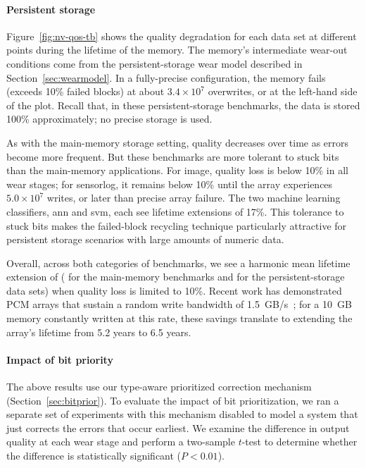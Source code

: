 \documentclass[prodmode,acmtocs]{acmsmall}
\begin{document}
\paragraph{Persistent storage}

Figure~\ref{fig:nv-qos-tb} shows the quality degradation for each data set at
different points during the lifetime of the memory.
The memory's intermediate
wear-out conditions come from the persistent-storage wear model described in
Section~\ref{sec:wearmodel}.
In a fully-precise configuration, the memory fails (exceeds 10\% failed blocks)
at about $3.4 \times 10^{7}$ overwrites, or at the left-hand side of the plot.
Recall that, in these persistent-storage benchmarks, the data is stored 100\%
approximately; no precise storage is used.

As with the main-memory storage setting, quality decreases over time as errors
become more frequent. But these benchmarks are more tolerant to stuck bits
than the main-memory applications. For \textsf{image}, quality loss is below
10\% in all wear stages; for \textsf{sensorlog}, it remains below 10\% until
the array experiences
$5.0 \times 10^{7}$ writes, or  later than precise array failure.
The two machine learning classifiers, \textsf{ann} and \textsf{svm},
each see lifetime extensions of 17\%.
This tolerance to
stuck bits makes the failed-block recycling technique particularly attractive
for persistent storage scenarios with large amounts of numeric data.

\vskip 12pt
\noindent
Overall, across both categories of benchmarks, we see a harmonic mean
lifetime extension of 
( for the main-memory benchmarks and
 for
the persistent-storage data sets) when quality loss is limited to 10\%.
Recent work has demonstrated PCM arrays that sustain a random write bandwidth of
1.5~GB/s~\cite{moneta};
for a 10~GB memory constantly written at this rate,
these savings translate to extending the array's lifetime
from 5.2 years to 6.5 years.

\paragraph{Impact of bit priority} The above results use our type-aware
prioritized correction mechanism (Section~\ref{sec:bitprior}). To evaluate the
impact of bit prioritization, we ran a separate set of experiments with this
mechanism disabled to model a system that just corrects the errors that
occur earliest. We examine the difference in output quality at each wear stage and
perform a two-sample $t$-test to determine whether the difference is
statistically significant ($P < 0.01$).
\end{document}
